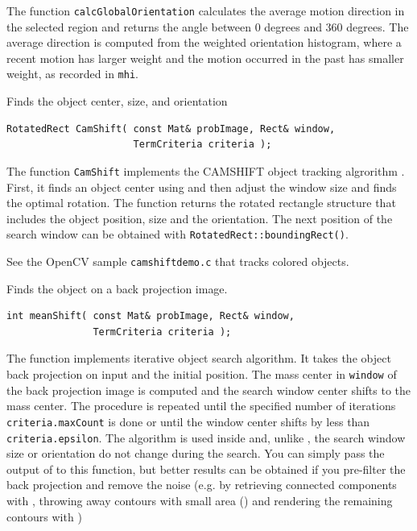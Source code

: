 The function \texttt{calcGlobalOrientation} calculates the average
motion direction in the selected region and returns the angle between
0 degrees  and 360 degrees. The average direction is computed from
the weighted orientation histogram, where a recent motion has larger
weight and the motion occurred in the past has smaller weight, as recorded in \texttt{mhi}.

\label{CamShift}
Finds the object center, size, and orientation

\begin{lstlisting}
RotatedRect CamShift( const Mat& probImage, Rect& window,
                      TermCriteria criteria );
\end{lstlisting}
\begin{description}
\end{description}

The function \texttt{CamShift} implements the CAMSHIFT object tracking algrorithm
.
First, it finds an object center using  and then adjust the window size and finds the optimal rotation. The function returns the rotated rectangle structure that includes the object position, size and the orientation. The next position of the search window can be obtained with \texttt{RotatedRect::boundingRect()}.

See the OpenCV sample \texttt{camshiftdemo.c} that tracks colored objects.

\label{meanShift}
Finds the object on a back projection image.

\begin{lstlisting}
int meanShift( const Mat& probImage, Rect& window,
               TermCriteria criteria );
\end{lstlisting}
\begin{description}
\end{description}

The function implements iterative object search algorithm. It takes the object back projection on input and the initial position. The mass center in \texttt{window} of the back projection image is computed and the search window center shifts to the mass center. The procedure is repeated until the specified number of iterations \texttt{criteria.maxCount} is done or until the window center shifts by less than \texttt{criteria.epsilon}. The algorithm is used inside  and, unlike , the search window size or orientation do not change during the search. You can simply pass the output of  to this function, but better results can be obtained if you pre-filter the back projection and remove the noise (e.g. by retrieving connected components with , throwing away contours with small area () and rendering the  remaining contours with )


